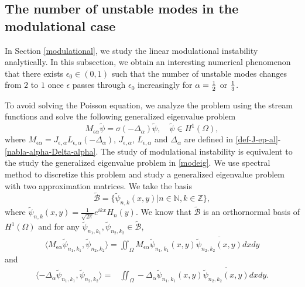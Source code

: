 \documentclass[1 [leqno, 11pt]{amsart}
\numberwithin{equation}{section}
\let\ep=\epsilon
\begin{document}
\begin{CJK*}{GBK}{song}
\subsection{The number of unstable modes in the modulational case}\label{The number of unstable modes in the modulational case}
In Section \ref{modulational}, we study the linear modulational instability analytically.  In this subsection, we obtain an interesting numerical phenomenon that there exists $\ep_0\in(0,1)$ such that  the number of unstable modes changes from $2$ to $1$ once $\ep$ passes through  $\ep_0$ increasingly for $\alpha={1\over 2}$ or ${1\over3}$.

To avoid solving the Poisson equation, we analyze the problem using the stream functions and solve the following generalized eigenvalue problem
 \begin{equation}\label{modeig}
 M_{\ep\alpha}\widetilde{\psi}=\sigma (-\Delta_\alpha) \widetilde{\psi}, \quad \widetilde{\psi} \in H^1(\Omega),
 \end{equation}
 where
$M_{\ep\alpha} = J_{\ep,\alpha}L_{\ep,\alpha} (-\Delta_\alpha)$, $J_{\ep,\alpha}$, $L_{\ep,\alpha}$ and $\Delta_\alpha$ are defined in \eqref{def-J-ep-al}-\eqref{nabla-alpha-Delta-alpha}.
The study of modulational instability is equivalent to the study the generalized eigenvalue problem in \eqref{modeig}. We  use spectral method to discretize this problem and study a generalized eigenvalue problem with two  approximation matrices. We take the basis
$$\tilde{\mathcal{B}} = \{\tilde{\psi}_{n,k}(x,y) | n \in \mathbb{N}, k \in \mathbb{Z}\},$$
where
$\tilde{\psi}_{n,k}(x,y) = \frac {1} {\sqrt{2\pi}}e^{ikx}H_n(y).$
We know that $\tilde{\mathcal{B}}$ is an orthornormal basis of $H^1(\Omega)$ and for any $\tilde{\psi}_{n_1,k_1}, \tilde{\psi}_{n_2,k_2} \in \tilde{\mathcal{B}}$,
\begin{align*}
\langle M_{\ep\alpha} \tilde{\psi}_{n_1,k_1} ,\tilde{\psi}_{n_2,k_2}\rangle
  =  \iint_\Omega M_{\ep\alpha} \tilde{\psi}_{n_1,k_1}(x,y) \overline{\tilde{\psi}_{n_2,k_2}(x,y)} dxdy
  \end{align*}
and
\begin{align*}
\langle-\Delta_\alpha \tilde{\psi}_{n_1,k_1} ,\tilde{\psi}_{n_2,k_2}\rangle
  = & \iint_\Omega -\Delta_\alpha \tilde{\psi}_{n_1,k_1}(x,y) \overline{\tilde{\psi}_{n_2,k_2}(x,y)} dxdy.\\
\end{align*}


\end{CJK*}
\end{document}
